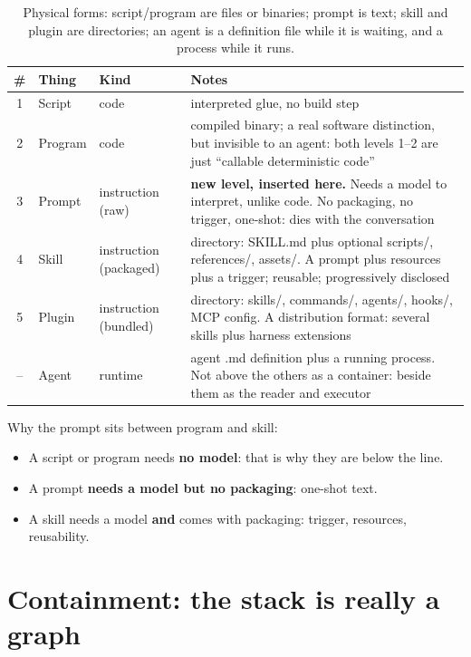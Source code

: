 \documentclass[11pt,a4paper]{article}
\begin{document}
\begin{table}[h]
\centering
\small
\begin{tabular}{@{}c l l p{6.2cm}@{}}
\toprule
\textbf{\#} & \textbf{Thing} & \textbf{Kind} & \textbf{Notes} \\
\midrule
1 & Script & code & interpreted glue, no build step \\
2 & Program & code & compiled binary; a real software distinction, but
  invisible to an agent: both levels 1--2 are just ``callable deterministic
  code'' \\
3 & Prompt & instruction (raw) & \textbf{new level, inserted here.} Needs a
  model to interpret, unlike code. No packaging, no trigger, one-shot: dies
  with the conversation \\
4 & Skill & instruction (packaged) & directory: SKILL.md plus optional
  scripts/, references/, assets/. A prompt plus resources plus a trigger;
  reusable; progressively disclosed \\
5 & Plugin & instruction (bundled) & directory: skills/, commands/, agents/,
  hooks/, MCP config. A distribution format: several skills plus harness
  extensions \\
-- & Agent & runtime & agent .md definition plus a running process. Not
  above the others as a container: beside them as the reader and executor \\
\bottomrule
\end{tabular}
\caption{Physical forms: script/program are files or binaries; prompt is
text; skill and plugin are directories; an agent is a definition file while
it is waiting, and a process while it runs.}
\end{table}

Why the prompt sits between program and skill:

\begin{itemize}
  \item A script or program needs \textbf{no model}: that is why they are
    below the line.
  \item A prompt \textbf{needs a model but no packaging}: one-shot text.
  \item A skill needs a model \textbf{and} comes with packaging: trigger,
    resources, reusability.
\end{itemize}

\section{Containment: the stack is really a graph}
\end{document}
